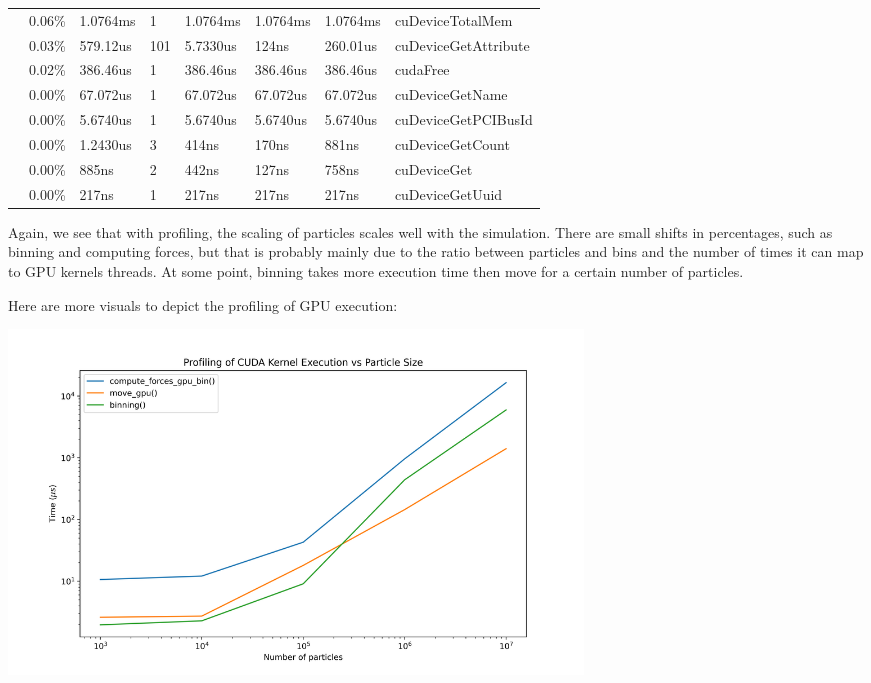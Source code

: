 \documentclass{article}
\begin{document}
\begin{table}[]
\begin{tabular}{llllllll}
           & 0.06\%   & 1.0764ms & 1     & 1.0764ms & 1.0764ms & 1.0764ms & cuDeviceTotalMem                     \\
           & 0.03\%   & 579.12us & 101   & 5.7330us & 124ns    & 260.01us & cuDeviceGetAttribute                 \\
           & 0.02\%   & 386.46us & 1     & 386.46us & 386.46us & 386.46us & cudaFree                             \\
           & 0.00\%   & 67.072us & 1     & 67.072us & 67.072us & 67.072us & cuDeviceGetName                      \\
           & 0.00\%   & 5.6740us & 1     & 5.6740us & 5.6740us & 5.6740us & cuDeviceGetPCIBusId                  \\
           & 0.00\%   & 1.2430us & 3     & 414ns    & 170ns    & 881ns    & cuDeviceGetCount                     \\
           & 0.00\%   & 885ns    & 2     & 442ns    & 127ns    & 758ns    & cuDeviceGet                          \\
           & 0.00\%   & 217ns    & 1     & 217ns    & 217ns    & 217ns    & cuDeviceGetUuid                     
\end{tabular}
\end{table}

Again, we see that with profiling, the scaling of particles scales well with the simulation. There are small shifts in percentages, such as binning and computing forces, but that is probably mainly due to the ratio between particles and bins and the number of times it can map to GPU kernels threads. At some point, binning takes more execution time then move for a certain number of particles. 

Here are more visuals to depict the profiling of GPU execution: \\

\centerline{\includegraphics[width=6in]{figures/profiling.png}}
\end{document}
